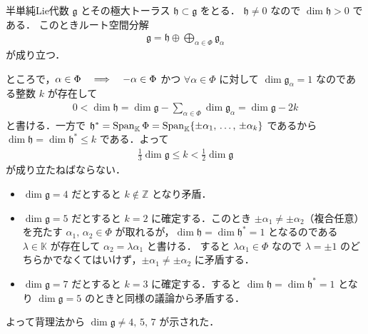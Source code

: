 \documentclass{ltjsarticle}
\makeatletter
\theoremstyle{mystyle} %
\renewcommand{\proofname}{証明}
\renewenvironment{proof}[1][\proofname]{\par
    \pushQED{\qed}%
    \normalfont \topsep6\p@\@plus6\p@\relax
    \trivlist
    \item[\hskip\labelsep
        \itshape
    \textbf{\underline{#1}}]\ignorespaces
}{%
    \popQED\endtrivlist\@endpefalse
}
\numberwithin{equation}{section}
\makeatother
\begin{document}
\begin{proof}
    半単純Lie代数 $\mathfrak{g}$ とその極大トーラス $\mathfrak{h} \subset \mathfrak{g}$ をとる．
    $\mathfrak{h} \neq 0$ なので $\dim \mathfrak{h} > 0$ である．
    このときルート空間分解
    \begin{align}
        \mathfrak{g} = \mathfrak{h} \oplus \bigoplus_{\alpha \in \Phi} \mathfrak{g}_\alpha
    \end{align}
    が成り立つ．

    ところで，$\alpha \in \Phi \quad \Longrightarrow \quad -\alpha \in \Phi$ かつ $\forall \alpha \in \Phi$ に対して $\dim \mathfrak{g}_\alpha = 1$ なのである整数 $k$ が存在して
    \begin{align}
        0 < \dim \mathfrak{h} = \dim \mathfrak{g} - \sum_{\alpha \in \Phi} \dim \mathfrak{g}_\alpha = \dim \mathfrak{g} - 2k
    \end{align}
    と書ける．一方で $\mathfrak{h}^* = \operatorname{Span}_{\mathbb{K}} \Phi = \operatorname{Span}_{\mathbb{K}} \{\pm \alpha_1,\, \dots,\, \pm\alpha_k\}$ であるから $\dim \mathfrak{h} = \dim \mathfrak{h}^* \le k$ である．よって
    \begin{align}
        \frac{1}{3} \dim \mathfrak{g} \le k < \frac{1}{2} \dim \mathfrak{g}
    \end{align}
    が成り立たねばならない．
    \begin{itemize}
        \item $\dim \mathfrak{g} = 4$ だとすると $k \notin \mathbb{Z}$ となり矛盾．
        \item $\dim \mathfrak{g} = 5$ だとすると $k=2$ に確定する．このとき $\pm \alpha_1 \neq \pm \alpha_2$（複合任意）を充たす $\alpha_1,\, \alpha_2 \in \Phi$ が取れるが，$\dim \mathfrak{h} = \dim \mathfrak{h}^* = 1$ となるのである $\lambda \in \mathbb{K}$ が存在して $\alpha_2 = \lambda \alpha_1$ と書ける．
        すると $\lambda \alpha_1 \in \Phi$ なので $\lambda = \pm 1$ のどちらかでなくてはいけず，$\pm \alpha_1 \neq \pm\alpha_2$ に矛盾する．
        \item $\dim \mathfrak{g} = 7$ だとすると $k=3$ に確定する．すると $\dim \mathfrak{h} = \dim \mathfrak{h}^* = 1$ となり $\dim \mathfrak{g} = 5$ のときと同様の議論から矛盾する．
    \end{itemize}
    よって背理法から $\dim \mathfrak{g} \neq 4,\, 5,\, 7$ が示された．
\end{proof}




\end{document}

